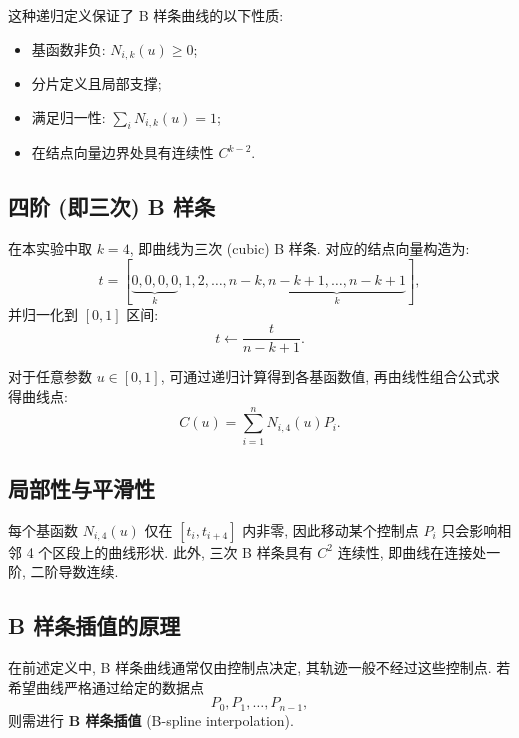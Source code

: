 \documentclass[12pt,a4paper]{article}
\begin{document}
            这种递归定义保证了 B 样条曲线的以下性质:
            \begin{itemize}
                \item 基函数非负: $N_{i,k}(u) \ge 0$;
                \item 分片定义且局部支撑;
                \item 满足归一性: $\sum_i N_{i,k}(u) = 1$;
                \item 在结点向量边界处具有连续性 $C^{k-2}$.
            \end{itemize}

        \subsection{四阶 (即三次) B 样条}
            在本实验中取 $k=4$, 即曲线为三次 (cubic) B 样条.
            对应的结点向量构造为:
            \begin{equation*}
                t = [\underbrace{0, 0, 0, 0}_{k}, 1, 2, \dots, n-k, \underbrace{n-k+1, \dots, n-k+1}_{k}],
            \end{equation*}
            并归一化到 $[0,1]$ 区间:
            \begin{equation*}
                t \leftarrow \frac{t}{n-k+1}.
            \end{equation*}

            对于任意参数 $u \in [0,1]$, 可通过递归计算得到各基函数值, 再由线性组合公式求得曲线点:
            \begin{equation*}
                C(u) = \sum_{i=1}^{n} N_{i,4}(u) P_i.
            \end{equation*}

        \subsection{局部性与平滑性}
            每个基函数 $N_{i,4}(u)$ 仅在 $[t_i, t_{i+4}]$ 内非零, 因此移动某个控制点 $P_i$ 只会影响相邻 4 个区段上的曲线形状. 此外, 三次 B 样条具有 $C^2$ 连续性, 即曲线在连接处一阶, 二阶导数连续.

        \subsection{B 样条插值的原理}
            在前述定义中, B 样条曲线通常仅由控制点决定, 其轨迹一般不经过这些控制点.
            若希望曲线严格通过给定的数据点
            \begin{equation*}
                P_0, P_1, \dots, P_{n-1},
            \end{equation*}
            则需进行 \textbf{B 样条插值} (B-spline interpolation).
\end{document}
